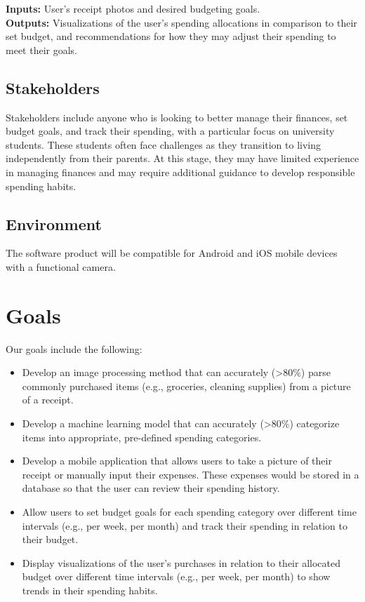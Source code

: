 \documentclass{article}
\begin{document}

\textbf{Inputs:} User's receipt photos and desired budgeting goals.\\
\textbf{Outputs:} Visualizations of the user's spending allocations in
comparison to their set budget, and recommendations for how they may adjust
their spending to meet their goals.

\subsection{Stakeholders}

Stakeholders include anyone who is looking to better manage their finances, set
budget goals, and track their spending, with a particular focus on university
students. These students often face challenges as they transition to living
independently from their parents. At this stage, they may have limited
experience in managing finances and may require additional guidance to develop
responsible spending habits.


\subsection{Environment}


The software product will be compatible for Android and iOS mobile devices with
a functional camera.

\section{Goals}

Our goals include the following:
\begin{itemize}
    \item Develop an image processing method that can accurately
    (\textgreater80\%) parse commonly purchased items (e.g., groceries, cleaning
    supplies) from a picture of a receipt.
    \item Develop a machine learning model that can accurately
    (\textgreater80\%) categorize items into appropriate, pre-defined spending
    categories. 
    \item Develop a mobile application that allows users to take a picture of
    their receipt or manually input their expenses. These expenses would be
    stored in a database so that the user can review their spending history.
    \item Allow users to set budget goals for each spending category over
    different time intervals (e.g., per week, per month) and track their spending
    in relation to their budget.
    \item Display visualizations of the user's purchases in relation to their
    allocated budget over different time intervals (e.g., per week, per month)
    to show trends in their spending habits.
\end{itemize}
\end{document}
